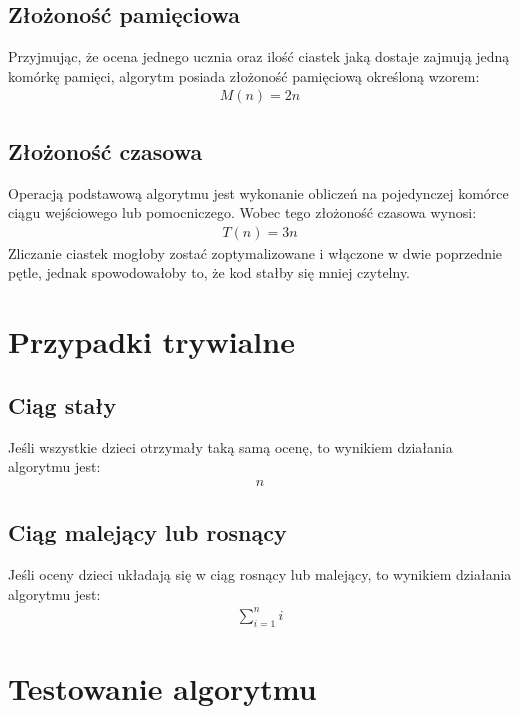 \documentclass{article}
\begin{document}
	\subsection{Złożoność pamięciowa}
	Przyjmując, że ocena jednego ucznia oraz ilość ciastek jaką dostaje zajmują jedną komórkę pamięci, algorytm posiada złożoność pamięciową określoną wzorem:
	\begin{align*}
		M(n) = 2n
	\end{align*}

	\subsection{Złożoność czasowa}
	Operacją podstawową algorytmu jest wykonanie obliczeń na pojedynczej komórce ciągu wejściowego lub pomocniczego. Wobec tego złożoność czasowa wynosi:
	\begin{align*}
		T(n) = 3n
	\end{align*}
	Zliczanie ciastek mogłoby zostać zoptymalizowane i włączone w dwie poprzednie pętle, jednak spowodowałoby to, że kod stałby się mniej czytelny.


	\section{Przypadki trywialne}

	\subsection{Ciąg stały}

	Jeśli wszystkie dzieci otrzymały taką samą ocenę, to wynikiem działania algorytmu jest:
	\begin{align*}
		n
	\end{align*}

	\subsection{Ciąg malejący lub rosnący}

	Jeśli oceny dzieci układają się w ciąg rosnący lub malejący, to wynikiem działania algorytmu jest:
	\begin{align*}
		\displaystyle\sum_{i=1}^{n} i
	\end{align*}

	\section{Testowanie algorytmu}
\end{document}
